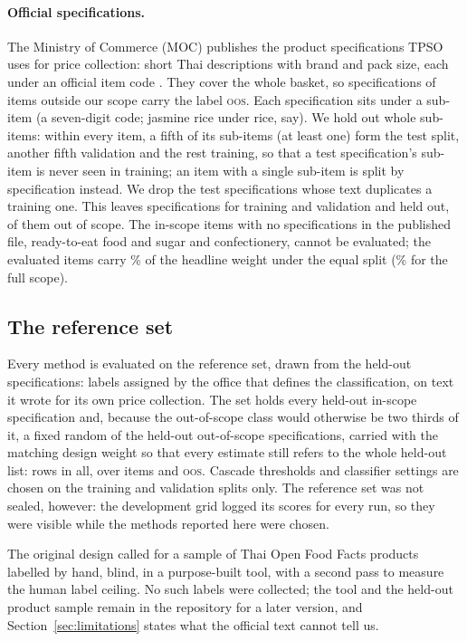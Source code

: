 \paragraph{Official specifications.} The Ministry of Commerce (MOC) publishes the product
specifications TPSO uses for price collection: short Thai descriptions with brand and pack
size, each under an official item code \citep{moc2026specs}. They cover the whole basket, so
specifications of items outside our scope carry the label \textsc{oos}. Each specification
sits under a sub-item (a seven-digit code; jasmine rice under rice, say). We hold out whole
sub-items: within every item, a fifth of its sub-items (at least one) form the test split,
another fifth validation and the rest training, so that a test specification's sub-item is
never seen in training; an item with a single sub-item is split by specification instead.
We drop the \NMocDupDropped{} test specifications whose text duplicates a training one. This
leaves \NMocTrainval{} specifications for training and validation and \NMocTest{} held out,
\NMocTestOos{} of them out of scope. The \NItemsWithoutSpecs{} in-scope items with no
specifications in the published file, ready-to-eat food and sugar and confectionery, cannot be
evaluated; the \NMocTestItems{} evaluated items carry \RefWeightEqual\% of the headline
weight under the equal split (\InScopeWeightEqual\% for the full scope).

\subsection{The reference set}\label{sec:ref}

Every method is evaluated on the reference set, drawn from the held-out specifications:
labels assigned by the office that defines the classification, on text it wrote for its own
price collection. The set holds every held-out in-scope specification and, because the
out-of-scope class would otherwise be two thirds of it, a fixed random \NRefOos{} of the
held-out out-of-scope specifications, carried with the matching design weight so that every
estimate still refers to the whole held-out list: \NRefSpecs{} rows in all, over
\NRefItems{} items and \textsc{oos}. Cascade thresholds and classifier settings are chosen
on the training and validation splits only. The reference set was not sealed, however: the
development grid logged its scores for every run, so they were visible while the methods
reported here were chosen.

The original design called for a sample of Thai Open Food Facts products labelled by hand,
blind, in a purpose-built tool, with a second pass to measure the human label ceiling. No
such labels were collected; the tool and the held-out product sample remain in the
repository for a later version, and Section~\ref{sec:limitations} states what the official
text cannot tell us.
